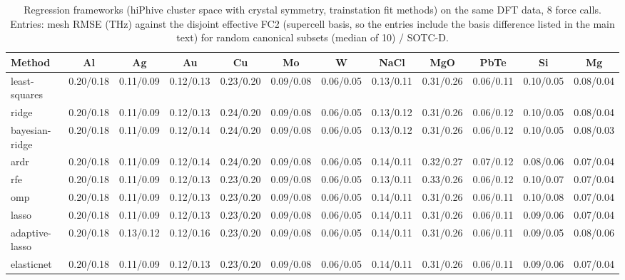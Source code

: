 \begin{table}[t]
\caption{Regression frameworks (hiPhive cluster space with crystal symmetry, trainstation fit methods) on the same DFT data, 8 force calls. Entries: mesh RMSE (THz) against the disjoint effective FC2 (supercell basis, so the entries include the basis difference listed in the main text) for random canonical subsets (median of 10) / SOTC-D.}
\label{tab:fitters}
\footnotesize
\begin{ruledtabular}
\begin{tabular}{lccccccccccc}
Method & Al & Ag & Au & Cu & Mo & W & NaCl & MgO & PbTe & Si & Mg\\
\hline
least-squares & 0.20/0.18 & 0.11/0.09 & 0.12/0.13 & 0.23/0.20 & 0.09/0.08 & 0.06/0.05 & 0.13/0.11 & 0.31/0.26 & 0.06/0.11 & 0.10/0.05 & 0.08/0.04\\
ridge & 0.20/0.18 & 0.11/0.09 & 0.12/0.13 & 0.24/0.20 & 0.09/0.08 & 0.06/0.05 & 0.13/0.12 & 0.31/0.26 & 0.06/0.12 & 0.10/0.05 & 0.08/0.04\\
bayesian-ridge & 0.20/0.18 & 0.11/0.09 & 0.12/0.14 & 0.24/0.20 & 0.09/0.08 & 0.06/0.05 & 0.13/0.12 & 0.31/0.26 & 0.06/0.12 & 0.10/0.05 & 0.08/0.03\\
ardr & 0.20/0.18 & 0.11/0.09 & 0.12/0.14 & 0.24/0.20 & 0.09/0.08 & 0.06/0.05 & 0.14/0.11 & 0.32/0.27 & 0.07/0.12 & 0.08/0.06 & 0.07/0.04\\
rfe & 0.20/0.18 & 0.11/0.09 & 0.12/0.13 & 0.23/0.20 & 0.09/0.08 & 0.06/0.05 & 0.13/0.11 & 0.33/0.26 & 0.06/0.12 & 0.10/0.07 & 0.07/0.04\\
omp & 0.20/0.18 & 0.11/0.09 & 0.12/0.13 & 0.23/0.20 & 0.09/0.08 & 0.06/0.05 & 0.14/0.11 & 0.31/0.26 & 0.06/0.11 & 0.10/0.08 & 0.07/0.04\\
lasso & 0.20/0.18 & 0.11/0.09 & 0.12/0.13 & 0.23/0.20 & 0.09/0.08 & 0.06/0.05 & 0.14/0.11 & 0.31/0.26 & 0.06/0.11 & 0.09/0.06 & 0.07/0.04\\
adaptive-lasso & 0.20/0.18 & 0.13/0.12 & 0.12/0.16 & 0.23/0.20 & 0.09/0.08 & 0.06/0.05 & 0.14/0.11 & 0.31/0.26 & 0.06/0.11 & 0.09/0.05 & 0.08/0.06\\
elasticnet & 0.20/0.18 & 0.11/0.09 & 0.12/0.13 & 0.23/0.20 & 0.09/0.08 & 0.06/0.05 & 0.14/0.11 & 0.31/0.26 & 0.06/0.11 & 0.09/0.06 & 0.07/0.04\\
\end{tabular}
\end{ruledtabular}
\end{table}
